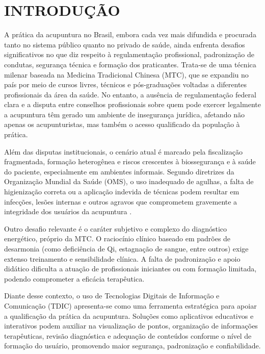 \chapter{INTRODUÇÃO} \label{cha:introducao}

A prática da acupuntura no Brasil, embora cada vez mais difundida e procurada tanto no sistema público quanto no privado de saúde, ainda enfrenta desafios significativos no que diz respeito à regulamentação profissional, padronização de condutas, segurança técnica e formação dos praticantes. Trata-se de uma técnica milenar baseada na Medicina Tradicional Chinesa (MTC), que se expandiu no país por meio de cursos livres, técnicos e pós-graduações voltadas a diferentes profissionais da área da saúde. No entanto, a ausência de regulamentação federal clara e a disputa entre conselhos profissionais sobre quem pode exercer legalmente a acupuntura têm gerado um ambiente de insegurança jurídica, afetando não apenas os acupunturistas, mas também o acesso qualificado da população à prática.

Além das disputas institucionais, o cenário atual é marcado pela fiscalização fragmentada, formação heterogênea e riscos crescentes à biossegurança e à saúde do paciente, especialmente em ambientes informais. Segundo diretrizes da Organização Mundial da Saúde (OMS), o uso inadequado de agulhas, a falta de higienização correta ou a aplicação indevida de técnicas podem resultar em infecções, lesões internas e outros agravos que comprometem gravemente a integridade dos usuários da acupuntura \cite{oms1999}.

Outro desafio relevante é o caráter subjetivo e complexo do diagnóstico energético, próprio da MTC. O raciocínio clínico baseado em padrões de desarmonia (como deficiência de Qi, estagnação de sangue, entre outros) exige extenso treinamento e sensibilidade clínica. A falta de padronização e apoio didático dificulta a atuação de profissionais iniciantes ou com formação limitada, podendo comprometer a eficácia terapêutica.

Diante desse contexto, o uso de Tecnologias Digitais de Informação e Comunicação (TDIC) apresenta-se como uma ferramenta estratégica para apoiar a qualificação da prática da acupuntura. Soluções como aplicativos educativos e interativos podem auxiliar na visualização de pontos, organização de informações terapêuticas, revisão diagnóstica e adequação de conteúdos conforme o nível de formação do usuário, promovendo maior segurança, padronização e confiabilidade.



